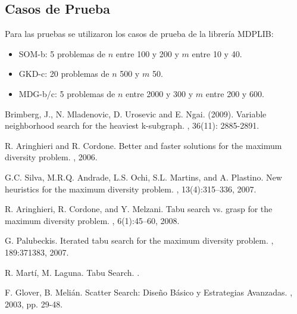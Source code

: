 \documentclass{ci5652}
\begin{document}
\subsection{Casos de Prueba}
Para las pruebas se utilizaron los casos de prueba de la librería MDPLIB:
\begin{itemize}
	\item SOM-b: 5 problemas de $n$ entre 100 y 200 y $m$ entre 10 y 40.
	\item GKD-c: 20 problemas de $n$ 500 y $m$ 50.
	\item MDG-b/c: 5 problemas de $n$ entre 2000 y 300 y $m$ entre 200 y 600.
\end{itemize}


\small


\begin{thebibliography}{99}

Brimberg, J., N. Mladenovic, D. Urosevic and E. Ngai. (2009).
\newblock Variable neighborhood search for the heaviest k-subgraph.
, 36(11): 2885-2891.

R. Aringhieri and R. Cordone.
\newblock Better and faster solutions for the maximum diversity problem.
, 2006.

G.C. Silva, M.R.Q. Andrade, L.S. Ochi, S.L. Martins, and A. Plastino.
\newblock New heuristics for the maximum diversity problem.
, 13(4):315–336, 2007.

R. Aringhieri, R. Cordone, and Y. Melzani.
\newblock Tabu search vs. grasp for the maximum diversity problem.
, 6(1):45–60, 2008.

G. Palubeckis.
\newblock Iterated tabu search for the maximum diversity problem.
, 189:371383, 2007.

R. Martí, M. Laguna.
\newblock Tabu Search.
.

F. Glover, B. Melián.
\newblock Scatter Search: Diseño Básico y Estrategias Avanzadas.
, 2003, pp. 29-48.


\end{thebibliography}
\end{document}
